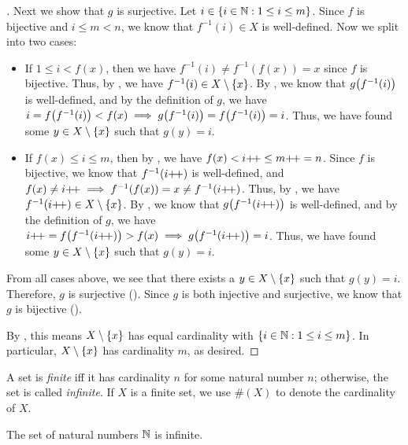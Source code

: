 \begin{proof}[]
  Next we show that \(g\) is surjective.
  Let \(i \in \left\lbrace i \in \mathbb{N} : 1 \leq i \leq m\right\rbrace\).
  Since \(f\) is bijective and \(i \leq m < n\), we know that \(f^{-1}(i) \in X\) is well-defined.
  Now we split into two cases:
  \begin{itemize}
    \item If \(1 \leq i < f(x)\), then we have \(f^{-1}(i) \neq f^{-1}(f(x)) = x\) since \(f\) is bijective.
          Thus, by , we have \(f^{-1}(i) \in X \setminus \left\lbrace x\right\rbrace\).
          By , we know that \(g\pa{f^{-1}(i)}\) is well-defined, and by the definition of \(g\), we have \(i = f\pa{f^{-1}(i)} < f(x) \implies g\pa{f^{-1}(i)} = f\pa{f^{-1}(i)} = i\).
          Thus, we have found some \(y \in X \setminus \left\lbrace x\right\rbrace\) such that \(g(y) = i\).
    \item If \(f(x) \leq i \leq m\), then by , we have \(f(x) < i{+}\!{+} \leq m{+}\!{+} = n\).
          Since \(f\) is bijective, we know that \(f^{-1}(i{+}\!{+})\) is well-defined, and \(f(x) \neq i{+}\!{+} \implies f^{-1}(f(x)) = x \neq f^{-1}(i{+}\!{+})\).
          Thus, by , we have \(f^{-1}(i{+}\!{+}) \in X \setminus \left\lbrace x\right\rbrace\).
          By , we know that \(g\pa{f^{-1}(i\pp)}\) is well-defined, and by the definition of \(g\), we have \(i\pp = f\pa{f^{-1}(i\pp)} > f(x) \implies g\pa{f^{-1}(i\pp)} = i\).
          Thus, we have found some \(y \in X \setminus \left\lbrace x\right\rbrace\) such that \(g(y) = i\).
  \end{itemize}
  From all cases above, we see that there exists a \(y \in X \setminus \left\lbrace x\right\rbrace\) such that \(g(y) = i\).
  Therefore, \(g\) is surjective ().
  Since \(g\) is both injective and surjective, we know that \(g\) is bijective ().

  By , this means \(X \setminus \left\lbrace x\right\rbrace\) has equal cardinality with \(\left\lbrace i \in \mathbb{N} : 1 \leq i \leq m\right\rbrace\).
  In particular, \(X \setminus \left\lbrace x\right\rbrace\) has cardinality \(m\), as desired.
\end{proof}

\begin{defn}\label{i:3.6.10}
  A set is \emph{finite} iff it has cardinality \(n\) for some natural number \(n\);
  otherwise, the set is called \emph{infinite}.
  If \(X\) is a finite set, we use \(\#(X)\) to denote the cardinality of \(X\).
\end{defn}

\setcounter{thm}{11}
\begin{thm}\label{i:3.6.12}
  The set of natural numbers \(\mathbb{N}\) is infinite.
\end{thm}

